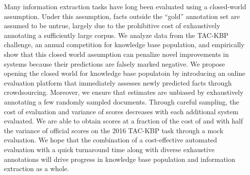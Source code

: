 Many information extraction tasks have long been evaluated using a closed-world assumption. 
Under this assumption, facts outside the “gold” annotation set are assumed to be untrue, largely due to the prohibitive cost of exhaustively annotating a sufficiently large corpus.
We analyze data from the TAC-KBP challenge, an annual competition for knowledge base population, and empirically show that this closed world assumption can penalize novel improvements in systems because their predictions are falsely marked negative.
We propose opening the closed world for knowledge base populatoin by introducing an online evaluation platform that immediately assesses newly predicted facts through crowdsourcing.
Moreover, we ensure that estimates are unbiased by exhaustively annotating a few randomly sampled documents.
Through careful sampling, the cost of evaluation and variance of scores decreases with each additional system evaluated.
We are able to obtain scores at a fraction of the cost of and with half the variance of official scores on the 2016 TAC-KBP task through a mock evaluation.
We hope that the combination of a cost-effective automated evaluation with a quick turnaround time along with diverse exhaustive annotations will drive progress in knowledge base population and information extraction as a whole.
